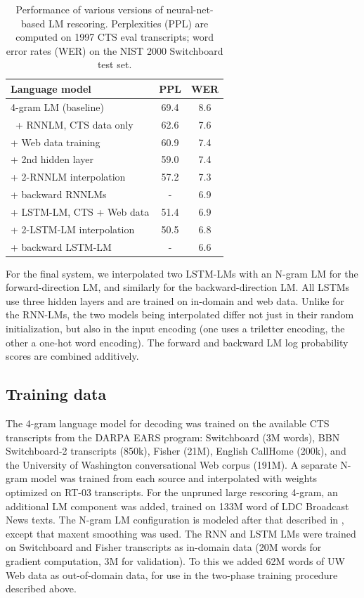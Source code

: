 \documentclass{article}
\begin{document}
\begin{table}
    \centering
    \caption{Performance of various versions of neural-net-based LM rescoring.
		Perplexities (PPL) are computed on 1997 CTS eval transcripts;
		word error rates (WER) on the NIST 2000 Switchboard test set.}
\vspace*{0.1in}
	\label{tab:rnnlm-results}
    \begin{tabular}{|l|c|c|}
    \hline
	Language model					&  PPL	& WER \\
     \hline \hline
       4-gram LM (baseline)                            & 69.4  & 8.6 \\
      \hline
       \  + RNNLM, CTS data only                       & 62.6  & 7.6 \\
	\quad + Web data training                      & 60.9  & 7.4 \\
	\quad \quad + 2nd hidden layer                 & 59.0  & 7.4 \\
	\quad \quad \quad + 2-RNNLM interpolation      & 57.2  & 7.3 \\
	\quad \quad \quad \quad + backward RNNLMs      & -     & 6.9 \\
      \hline
	+ LSTM-LM, CTS + Web data		& 51.4	& 6.9 \\	%
	\quad + 2-LSTM-LM interpolation		& 50.5	& 6.8 \\	%
	\quad \quad + backward LSTM-LM		& -	& 6.6 \\	%
      \hline
    \end{tabular}
\end{table}
For the final system, we interpolated two LSTM-LMs with an N-gram LM for the forward-direction LM,
and similarly for the backward-direction LM.
All LSTMs use three hidden layers and are trained on in-domain and web data. 
Unlike for the RNN-LMs, the two models being interpolated differ not just in their random initialization, but 
also in the input encoding (one uses a triletter encoding, the other a one-hot word encoding).
The forward and backward LM log probability scores are combined additively.
\subsection{Training data}
The 4-gram language model for decoding was trained on the available CTS transcripts from the 
DARPA EARS program: Switchboard (3M words), BBN Switchboard-2 transcripts (850k), Fisher (21M), 
English CallHome (200k), and the University of Washington conversational Web corpus (191M).
A separate N-gram model was trained from each source and interpolated with weights optimized on RT-03 transcripts.
For the unpruned large rescoring 4-gram, an additional LM component was added, trained on 133M word of LDC
Broadcast News texts.  The N-gram LM configuration is modeled after that described in \cite{saonSRK16}, except that
maxent smoothing was used.
The RNN and LSTM LMs were trained on Switchboard and Fisher transcripts as in-domain data (20M words for gradient computation,
3M for validation).
To this we added 62M words of UW Web data as out-of-domain data,
for use in the two-phase training procedure described above.  
\end{document}
